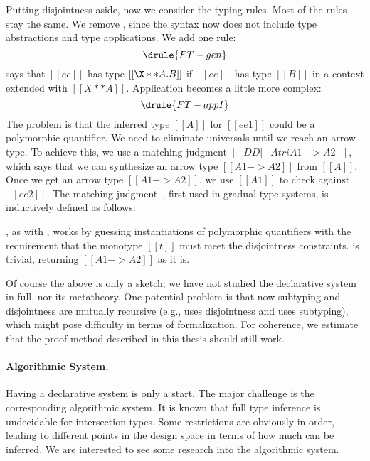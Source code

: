 Putting disjointness aside, now we consider the typing rules. Most of the rules
stay the same. We remove , since the syntax now does not
include type abstractions and type applications. We add one rule:
\[
  \drule{FT-gen}
\]
 says that $[[ee]]$ has type $[[\X ** A . B]]$ if $[[ee]]$ has type $[[B]]$ in a context extended with $[[ X ** A  ]]$.
Application becomes a little more complex:
\[
  \drule{FT-appI}
\]
The problem is that the inferred type $[[A]]$ for $[[ee1]]$ could be a
polymorphic quantifier.
We need to eliminate universals until we
reach an arrow type. To achieve this, we use a matching judgment $[[DD |- A tri A1 -> A2]]$,
which says that we can synthesize an arrow type $[[A1 -> A2]]$ from $[[A]]$.
Once we get an arrow type $[[A1 -> A2]]$, we use $[[A1]]$ to check against $[[ee2]]$.
The matching judgment~\citep{siek2015refined, xie2018consistent}, first used in gradual type systems, is inductively defined as follows:
\begin{mathpar}
\end{mathpar}
, as with ,
works by guessing instantiations of polymorphic quantifiers with the requirement
that the monotype $[[t]]$ must meet the disjointness constraints. 
is trivial, returning $[[A1 -> A2]]$ as it is.



Of course the above is only a sketch; we have not studied the declarative system in full,
nor its metatheory. One potential problem is that now subtyping and
disjointness are mutually recursive (e.g.,  uses disjointness and
 uses subtyping), which might pose difficulty in terms of
formalization. For coherence, we estimate that the proof method described in
this thesis should still work.



\paragraph{Algorithmic System.}

Having a declarative system is only a start. The major challenge is the
corresponding algorithmic system. It is known that full type inference is
undecidable for intersection types. Some restrictions are obviously in order,
leading to different points in the design space in terms of how much can be
inferred. We are interested to see some research into the algorithmic system.


